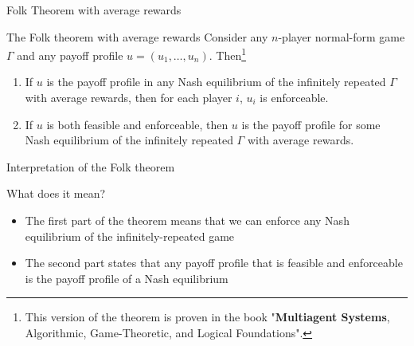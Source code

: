 \begin{frame}{Folk Theorem with average rewards}

    \begin{block}{The Folk theorem with average rewards}
        Consider any $n$-player normal-form game $\Gamma$ and any payoff profile
        $u = (u_1, \dots, u_n)$. Then\footnote{This version of the theorem is proven
        in the book "\textbf{Multiagent Systems}, Algorithmic, Game-Theoretic, and Logical
        Foundations".}
        \begin{enumerate}
            \item If $u$ is the payoff profile in any Nash equilibrium of the infinitely
            repeated $\Gamma$ with average rewards, then for each player $i$, $u_i$ is enforceable.
            \item If $u$ is both feasible and enforceable, then $u$ is the payoff profile for some
            Nash equilibrium of the infinitely repeated $\Gamma$ with average rewards.
        \end{enumerate}
    \end{block}
\end{frame}


\begin{frame}{Interpretation of the Folk theorem}
    \begin{exampleblock}{What does it mean?}
        \begin{itemize}
            \item The first part of the theorem means that we can enforce any Nash equilibrium
            of the infinitely-repeated game
            \item The second part states that any payoff profile that is feasible and enforceable
            is the payoff profile of a Nash equilibrium 
        \end{itemize}
    \end{exampleblock}
\end{frame}

